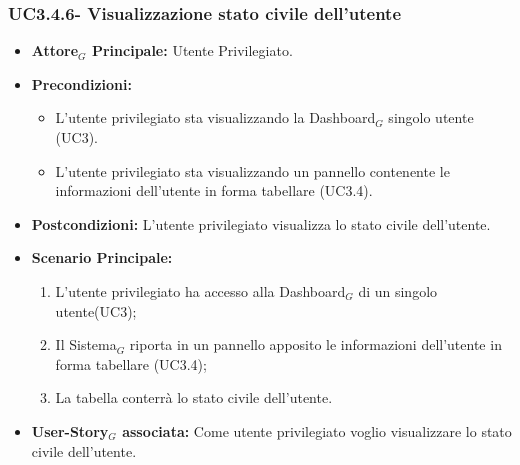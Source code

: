 \documentclass[10pt]{article}
\begin{document}
\begin{justify}
\subsubsection{\textbf{UC3.4.6- Visualizzazione stato civile dell'utente}}
\label{UC3.4.6}
\begin{itemize}
     \item \textbf{Attore$_G$ Principale:} Utente Privilegiato.
     \item \textbf{Precondizioni:}
        \begin{itemize}
    	\item L'utente privilegiato sta visualizzando la Dashboard$_G$ singolo utente (UC3).
          \item L'utente privilegiato sta visualizzando un pannello contenente le informazioni dell'utente in forma tabellare (UC3.4).
        \end{itemize}
      \item \textbf{Postcondizioni:} L'utente privilegiato visualizza lo stato civile dell'utente. 
      \item \textbf{Scenario Principale:}
        \begin{enumerate}
            \item L'utente privilegiato ha accesso alla Dashboard$_G$ di un singolo utente(UC3);
            \item Il Sistema$_G$ riporta  in un pannello apposito le informazioni dell'utente in forma tabellare (UC3.4);
            \item La tabella conterrà lo stato civile dell'utente.
        \end{enumerate}
     \item \textbf{User-Story$_G$ associata:}
       Come utente privilegiato voglio visualizzare lo stato civile dell'utente.
\end{itemize}


\end{justify}
\end{document}
